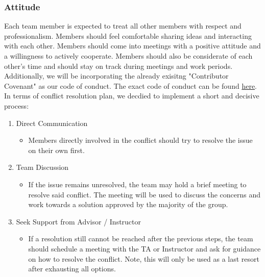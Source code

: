 \documentclass{article}
\begin{document}
{\subsubsection*{Attitude}


Each team member is expected to treat all other members with respect and 
professionalism. Members should feel comfortable sharing ideas and 
interacting with each other. Members should come into meetings with a
 positive attitude and a willingness to actively cooperate. 
 Members should also be considerate of each other’s time and 
 should stay on track during meetings and work periods.\\

Additionally, we will be incorporating the already exisitng 
"Contributor Covenant" as our code of conduct. 
The exact code of conduct can be found 
\href{https://www.contributor-covenant.org/version/2/1/code_of_conduct/}
{here}. \\

In terms of conflict resolution plan, we decdied to implement a short and decisive process: \\
\begin{enumerate}
  \item Direct Communication
  \begin{itemize}
    \item Members directly involved in the conflict should 
    try to resolve the issue on their own first. 
  \end{itemize}
  \item Team Discussion
  \begin{itemize}
    \item If the issue remains unresolved, the team may hold a brief
    meeting to resolve said conflict. The meeting will be used to discuss
    the concerns and work towards a solution 
    approved by the majority of the group.
  \end{itemize}
  \item Seek Support from Advisor / Instructor
  \begin{itemize}
    \item If a resolution still cannot be reached after the previous steps,
    the team should schedule a meeting with the TA or Instructor and ask for 
    guidance on how to resolve the conflict. Note, this will only be used as
    a last resort after exhausting all options.
  \end{itemize}
\end{enumerate}

}
\end{document}
